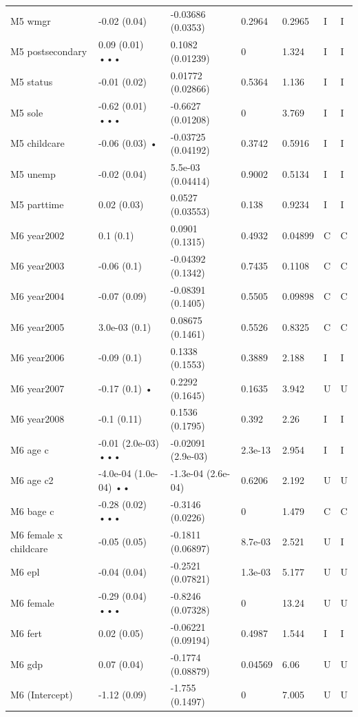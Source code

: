{\begin{longtable}{@{}p{.245\linewidth}p{.17\linewidth}p{.17\linewidth}p{.085\linewidth}p{.060\linewidth}p{.08\linewidth}p{.07\linewidth}@{}}
M5 wmgr & -0.02 (0.04) & -0.03686 (0.0353) & 0.2964 & 0.2965 & I & I\\
M5 postsecondary & 0.09 (0.01) ••• & 0.1082 (0.01239) & 0 & 1.324 & I & I\\
M5 status & -0.01 (0.02) & 0.01772 (0.02866) & 0.5364 & 1.136 & I & I\\
M5 sole & -0.62 (0.01) ••• & -0.6627 (0.01208) & 0 & 3.769 & I & I\\
M5 childcare & -0.06 (0.03) • & -0.03725 (0.04192) & 0.3742 & 0.5916 & I & I\\
M5 unemp & -0.02 (0.04) & 5.5e-03 (0.04414) & 0.9002 & 0.5134 & I & I\\
M5 parttime & 0.02 (0.03) & 0.0527 (0.03553) & 0.138 & 0.9234 & I & I\\
M6 year2002 & 0.1 (0.1) & 0.0901 (0.1315) & 0.4932 & 0.04899 & C & C\\
M6 year2003 & -0.06 (0.1) & -0.04392 (0.1342) & 0.7435 & 0.1108 & C & C\\
M6 year2004 & -0.07 (0.09) & -0.08391 (0.1405) & 0.5505 & 0.09898 & C & C\\
M6 year2005 & 3.0e-03 (0.1) & 0.08675 (0.1461) & 0.5526 & 0.8325 & C & C\\
M6 year2006 & -0.09 (0.1) & 0.1338 (0.1553) & 0.3889 & 2.188 & I & I\\
M6 year2007 & -0.17 (0.1) • & 0.2292 (0.1645) & 0.1635 & 3.942 & U & U\\
M6 year2008 & -0.1 (0.11) & 0.1536 (0.1795) & 0.392 & 2.26 & I & I\\
M6 age c & -0.01 (2.0e-03) ••• & -0.02091 (2.9e-03) & 2.3e-13 & 2.954 & I & I\\
M6 age c2 & -4.0e-04 (1.0e-04) •• & -1.3e-04 (2.6e-04) & 0.6206 & 2.192 & U & U\\
M6 bage c & -0.28 (0.02) ••• & -0.3146 (0.0226) & 0 & 1.479 & C & C\\
M6 female x childcare & -0.05 (0.05) & -0.1811 (0.06897) & 8.7e-03 & 2.521 & U & I\\
M6 epl & -0.04 (0.04) & -0.2521 (0.07821) & 1.3e-03 & 5.177 & U & U\\
M6 female & -0.29 (0.04) ••• & -0.8246 (0.07328) & 0 & 13.24 & U & U\\
M6 fert & 0.02 (0.05) & -0.06221 (0.09194) & 0.4987 & 1.544 & I & I\\
M6 gdp & 0.07 (0.04) & -0.1774 (0.08879) & 0.04569 & 6.06 & U & U\\
M6 (Intercept) & -1.12 (0.09) & -1.755 (0.1497) & 0 & 7.005 & U & U\\

\end{longtable}}
